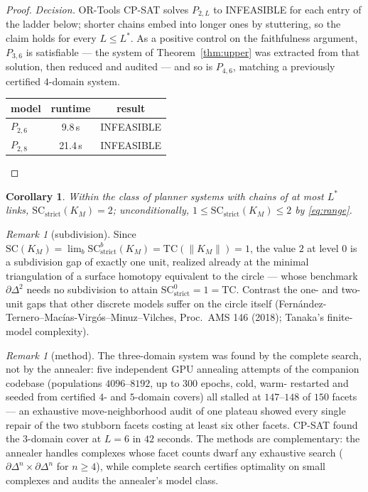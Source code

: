 \documentclass[11pt]{article}
\newtheorem{corollary}[theorem]{Corollary}
\theoremstyle{remark}
\newtheorem{remark}[theorem]{Remark}
\begin{document}
\begin{proof}
\emph{Decision.}  OR-Tools CP-SAT solves $P_{2,L}$ to INFEASIBLE for each
entry of the ladder below; shorter chains embed into longer ones by
stuttering, so the claim holds for every $L\le L^\ast$.  As a positive
control on the faithfulness argument, $P_{3,6}$ is satisfiable --- the
system of Theorem~\ref{thm:upper} was extracted from that solution, then
reduced and audited --- and so is $P_{4,6}$, matching a previously
certified $4$-domain system.
\begin{center}
\begin{tabular}{lcc}
\hline
model & runtime & result \\
\hline
$P_{2,6}$ & 9.8\,s & INFEASIBLE \\
$P_{2,8}$ & 21.4\,s & INFEASIBLE \\
\hline
\end{tabular}
\end{center}
\end{proof}

\begin{corollary}\label{cor:exact}
Within the class of planner systems with chains of at most $L^\ast$ links,
$\mathrm{SC}_{\mathrm{strict}}(K_M)=2$; unconditionally,
$1\le\mathrm{SC}_{\mathrm{strict}}(K_M)\le2$ by \eqref{eq:range}.
\end{corollary}

\begin{remark}[subdivision]
Since $\mathrm{SC}(K_M)=\lim_b\mathrm{SC}^{b}_{\mathrm{strict}}(K_M)
=\mathrm{TC}(\|K_M\|)=1$, the value $2$ at level $0$ is a subdivision gap
of exactly one unit, realized already at the minimal triangulation of a
surface homotopy equivalent to the circle --- whose benchmark
$\partial\Delta^2$ needs no subdivision to attain
$\mathrm{SC}^{0}_{\mathrm{strict}}=1=\mathrm{TC}$.  Contrast the
one- and two-unit gaps that other discrete models suffer on the circle
itself (Fern\'andez-Ternero--Mac\'ias-Virg\'os--Minuz--Vilches, Proc.\ AMS
146 (2018); Tanaka's finite-model complexity).
\end{remark}

\begin{remark}[method]
The three-domain system was found by the complete search, not by the
annealer: five independent GPU annealing attempts of the companion
codebase (populations $4096$--$8192$, up to $300$ epochs, cold, warm-
restarted and seeded from certified $4$- and $5$-domain covers) all
stalled at $147$--$148$ of $150$ facets --- an exhaustive move-neighborhood
audit of one plateau showed every single repair of the two stubborn facets
costing at least six other facets.  CP-SAT found the $3$-domain cover at
$L=6$ in $42$ seconds.  The methods are complementary: the annealer
handles complexes whose facet counts dwarf any exhaustive search
($\partial\Delta^n\times\partial\Delta^n$ for $n\ge4$), while complete
search certifies optimality on small complexes and audits the annealer's
model class.
\end{remark}
\end{document}
